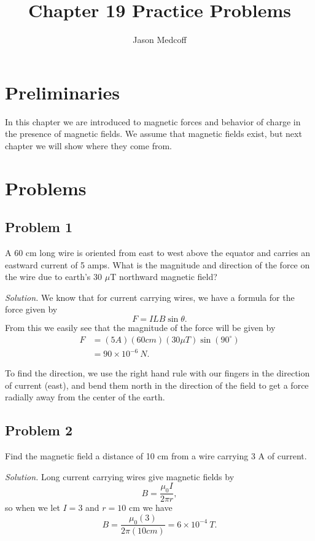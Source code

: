 \documentclass{article}
\title{Chapter 19 Practice Problems}
\author{Jason Medcoff}
\date{}
\begin{document}
	\maketitle
	
	\section{Preliminaries}
	
	In this chapter we are introduced to magnetic forces and behavior of charge in the presence of magnetic fields. We assume that magnetic fields exist, but next chapter we will show where they come from.
	
	\section{Problems}
	
	\subsection{Problem 1}
	
	A 60 cm long wire is oriented from east to west above the equator and carries an eastward current of 5 amps. What is the magnitude and direction of the force on the wire due to earth's 30 $\mu$T northward magnetic field?
	
	\textit{Solution.}
	We know that for current carrying wires, we have a formula for the force given by
	$$ F = ILB\sin\theta . $$
	From this we easily see that the magnitude of the force will be given by
	\begin{equation*}
	\begin{split}
	F & = (5A)(60cm)(30\mu T)\sin(90^{\circ}) \\
	& = 90 \times 10^{-6} \ N .
	\end{split}
	\end{equation*}
	
	To find the direction, we use the right hand rule with our fingers in the direction of current (east), and bend them north in the direction of the field to get a force radially away from the center of the earth.
	
	\subsection{Problem 2}
	Find the magnetic field a distance of 10 cm from a wire carrying 3 A of current.
	
	\textit{Solution.}
	Long current carrying wires give magnetic fields by
	$$ B = \frac{\mu_0 I}{2\pi r} , $$
	so when we let $I = 3$ and $r = 10$ cm we have
	$$ B = \frac{\mu_0 (3)}{2\pi (10cm)} = 6\times 10^{-4} \ T. $$
	
\end{document}
